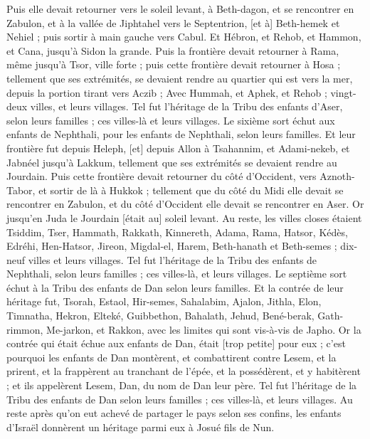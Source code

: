 \begin{multicols}{2}
Puis elle devait retourner vers le soleil levant, à Beth-dagon, et se rencontrer en Zabulon, et à la vallée de Jiphtahel vers le Septentrion, [et à] Beth-hemek et Nehiel ; puis sortir à main gauche vers Cabul.
Et Hébron, et Rehob, et Hammon, et Cana, jusqu'à Sidon la grande.
Puis la frontière devait retourner à Rama, même jusqu'à Tsor, ville forte ; puis cette frontière devait retourner à Hosa ; tellement que ses extrémités, se devaient rendre au quartier qui est vers la mer, depuis la portion tirant vers Aczib ;
Avec Hummah, et Aphek, et Rehob ; vingt-deux villes, et leurs villages.
Tel fut l'héritage de la Tribu des enfants d'Aser, selon leurs familles ; ces villes-là et leurs villages.
Le sixième sort échut aux enfants de Nephthali, pour les enfants de Nephthali, selon leurs familles.
Et leur frontière fut depuis Heleph, [et] depuis Allon à Tsahannim, et Adami-nekeb, et Jabnéel jusqu'à Lakkum, tellement que ses extrémités se devaient rendre au Jourdain.
Puis cette frontière devait retourner du côté d'Occident, vers Aznoth-Tabor, et sortir de là à Hukkok ; tellement que du côté du Midi elle devait se rencontrer en Zabulon, et du côté d'Occident elle devait se rencontrer en Aser. Or jusqu'en Juda le Jourdain [était au] soleil levant.
Au reste, les villes closes étaient Tsiddim, Tser, Hammath, Rakkath, Kinnereth,
Adama, Rama, Hatsor,
Kédès, Edréhi, Hen-Hatsor,
Jireon, Migdal-el, Harem, Beth-hanath et Beth-semes ; dix-neuf villes et leurs villages.
Tel fut l'héritage de la Tribu des enfants de Nephthali, selon leurs familles ; ces villes-là, et leurs villages.
Le septième sort échut à la Tribu des enfants de Dan selon leurs familles.
Et la contrée de leur héritage fut, Tsorah, Estaol, Hir-semes,
Sahalabim, Ajalon, Jithla,
Elon, Timnatha, Hekron,
Elteké, Guibbethon, Bahalath,
Jehud, Bené-berak, Gath-rimmon,
Me-jarkon, et Rakkon, avec les limites qui sont vis-à-vis de Japho.
Or la contrée qui était échue aux enfants de Dan, était [trop petite] pour eux ; c'est pourquoi les enfants de Dan montèrent, et combattirent contre Lesem, et la prirent, et la frappèrent au tranchant de l'épée, et la possédèrent, et y habitèrent ; et ils appelèrent Lesem, Dan, du nom de Dan leur père.
Tel fut l'héritage de la Tribu des enfants de Dan selon leurs familles ; ces villes-là, et leurs villages.
Au reste après qu'on eut achevé de partager le pays selon ses confins, les enfants d'Israël donnèrent un héritage parmi eux à Josué fils de Nun.

\end{multicols}
